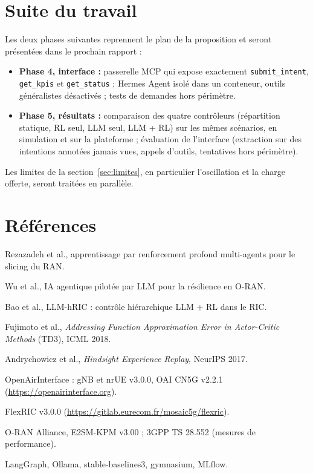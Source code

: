 \documentclass[11pt,a4paper]{article}
\newcommand{\tool}[1]{\texttt{#1}}
\begin{document}
\section{Suite du travail}

Les deux phases suivantes reprennent le plan de la proposition et seront présentées dans le
prochain rapport :
\begin{itemize}
  \item \textbf{Phase 4, interface :} passerelle MCP qui expose exactement
        \tool{submit\_intent}, \tool{get\_kpis} et \tool{get\_status} ; Hermes Agent isolé dans
        un conteneur, outils généralistes désactivés ; tests de demandes hors périmètre.
  \item \textbf{Phase 5, résultats :} comparaison des quatre contrôleurs (répartition statique,
        RL seul, LLM seul, LLM + RL) sur les mêmes scénarios, en simulation et sur la plateforme ;
        évaluation de l'interface (extraction sur des intentions annotées jamais vues, appels
        d'outils, tentatives hors périmètre).
\end{itemize}
Les limites de la section~\ref{sec:limites}, en particulier l'oscillation et la charge offerte,
seront traitées en parallèle.

\section*{Références}
\small
\begin{enumerate}[label={[\arabic*]}]
  \item Rezazadeh et al., apprentissage par renforcement profond multi-agents pour le slicing du RAN.
  \item Wu et al., IA agentique pilotée par LLM pour la résilience en O-RAN.
  \item Bao et al., LLM-hRIC : contrôle hiérarchique LLM + RL dans le RIC.
  \item Fujimoto et al., \emph{Addressing Function Approximation Error in Actor-Critic Methods} (TD3), ICML 2018.
  \item Andrychowicz et al., \emph{Hindsight Experience Replay}, NeurIPS 2017.
  \item OpenAirInterface : gNB et nrUE v3.0.0, OAI CN5G v2.2.1 (\url{https://openairinterface.org}).
  \item FlexRIC v3.0.0 (\url{https://gitlab.eurecom.fr/mosaic5g/flexric}).
  \item O-RAN Alliance, E2SM-KPM v3.00 ; 3GPP TS 28.552 (mesures de performance).
  \item LangGraph, Ollama, stable-baselines3, gymnasium, MLflow.
\end{enumerate}
\end{document}
